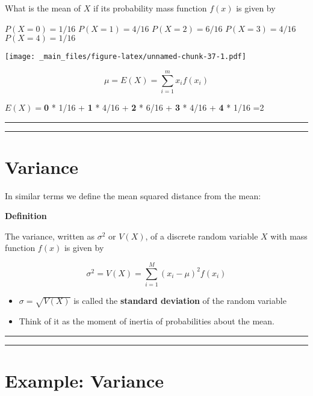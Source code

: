 \documentclass[
]{book}
\begin{document}
What is the mean of \(X\) if its probability mass function \(f(x)\) is given by

\(P(X=0)=1/16\)
\(P(X=1)=4/16\)
\(P(X=2)=6/16\)
\(P(X=3)=4/16\)
\(P(X=4)=1/16\)

\texttt{[image: \_main\_files/figure-latex/unnamed-chunk-37-1.pdf]}

\[ \mu =E(X)=\sum_{i=1}^m x_i f(x_i) \]

\(E(X)=\)\textbf{0} * 1/16 + \textbf{1} * 4/16 + \textbf{2} * 6/16 + \textbf{3} * 4/16 + \textbf{4} * 1/16 =2

\begin{center}\rule{0.5\linewidth}{0.5pt}\end{center}

\begin{center}\rule{0.5\linewidth}{0.5pt}\end{center}

\hypertarget{variance}{%
\section{Variance}\label{variance}}

In similar terms we define the mean squared distance from the mean:

\textbf{Definition}

The variance, written as \(\sigma^2\) or \(V(X)\), of a discrete random variable \(X\) with mass function \(f(x)\) is given by

\[\sigma^2 = V(X)= \sum_{i=1}^M (x_i-\mu)^2 f(x_i)\]

\begin{itemize}
\item
  \(\sigma=\sqrt{V(X)}\) is called the \textbf{standard deviation} of the random variable
\item
  Think of it as the moment of inertia of probabilities about the mean.
\end{itemize}

\begin{center}\rule{0.5\linewidth}{0.5pt}\end{center}

\begin{center}\rule{0.5\linewidth}{0.5pt}\end{center}

\hypertarget{example-variance}{%
\section{Example: Variance}\label{example-variance}}
\end{document}
